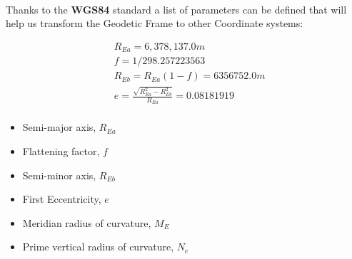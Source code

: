 \paragraph{}Thanks to the \textbf{WGS84} standard a list of parameters can be defined that will help us transform the Geodetic Frame to other Coordinate systems:

\begin{align*}
& R_{Ea} = 6,378,137.0 m \\
& f = 1/298.257223563 \\
& R_{Eb} = R_{Ea}(1-f) = 6356752.0m \\
& e = \frac{\sqrt{R_{Ea}^2-R_{Eb}^2}}{R_{Ea}} = 0.08181919 \\
\label{eq:los_distToHorizon}
\end{align*} 

\begin{itemize}
\item{Semi-major axis, $R_{Ea}$}
\item{Flattening factor, $f$}
\item{Semi-minor axis, $R_{Eb}$}
\item{First Eccentricity, $e$}
\item{Meridian radius of curvature, $M_{E}$}
\item{Prime vertical radius of curvature, $N_{e}$}
\end{itemize}
